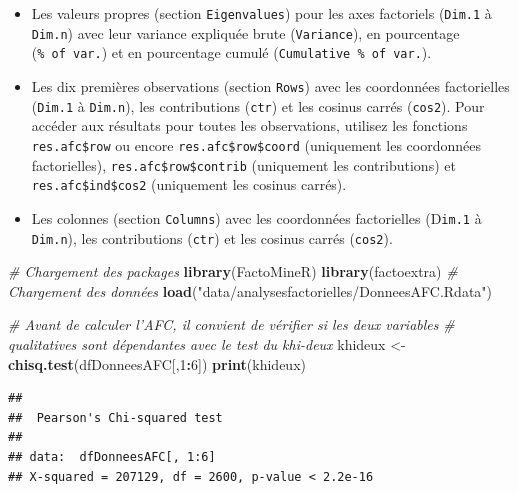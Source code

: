 \documentclass[
  11pt,
  french,
]{book}
\makeatletter
\newenvironment{Shaded}{\begin{snugshade}}{\end{snugshade}}
\newcommand{\CharTok}[1]{\textcolor[rgb]{0.31,0.60,0.02}{#1}}
\newcommand{\CommentTok}[1]{\textcolor[rgb]{0.56,0.35,0.01}{\textit{#1}}}
\newcommand{\ControlFlowTok}[1]{\textcolor[rgb]{0.13,0.29,0.53}{\textbf{#1}}}
\newcommand{\DecValTok}[1]{\textcolor[rgb]{0.00,0.00,0.81}{#1}}
\newcommand{\FloatTok}[1]{\textcolor[rgb]{0.00,0.00,0.81}{#1}}
\newcommand{\KeywordTok}[1]{\textcolor[rgb]{0.13,0.29,0.53}{\textbf{#1}}}
\newcommand{\NormalTok}[1]{#1}
\newcommand{\OperatorTok}[1]{\textcolor[rgb]{0.81,0.36,0.00}{\textbf{#1}}}
\newcommand{\StringTok}[1]{\textcolor[rgb]{0.31,0.60,0.02}{#1}}
\providecommand{\tightlist}{%
  \setlength{\itemsep}{0pt}\setlength{\parskip}{0pt}}
\newenvironment{kframe}{%
\medskip{}
\setlength{\fboxsep}{.8em}
 \def\at@end@of@kframe{}%
 \ifinner\ifhmode%
  \def\at@end@of@kframe{\end{minipage}}%
  \begin{minipage}{\columnwidth}%
 \fi\fi%
 \def\FrameCommand##1{\hskip\@totalleftmargin \hskip-\fboxsep
 \colorbox{shadecolor}{##1}\hskip-\fboxsep
     \hskip-\linewidth \hskip-\@totalleftmargin \hskip\columnwidth}%
 \MakeFramed {\advance\hsize-\width
   \@totalleftmargin\z@ \linewidth\hsize
   \@setminipage}}%
 {\par\unskip\endMakeFramed%
 \at@end@of@kframe}
\renewenvironment{Shaded}{\begin{kframe}}{\end{kframe}}
\makeatother
\begin{document}
\begin{itemize}
\tightlist
\item
  Les valeurs propres (section \texttt{Eigenvalues}) pour les axes factoriels (\texttt{Dim.1} à \texttt{Dim.n}) avec leur variance expliquée brute (\texttt{Variance}), en pourcentage (\texttt{\%\ of\ var.}) et en pourcentage cumulé (\texttt{Cumulative\ \%\ of\ var.}).
\item
  Les dix premières observations (section \texttt{Rows}) avec les coordonnées factorielles (\texttt{Dim.1} à \texttt{Dim.n}), les contributions (\texttt{ctr}) et les cosinus carrés (\texttt{cos2}). Pour accéder aux résultats pour toutes les observations, utilisez les fonctions \texttt{res.afc\$row} ou encore \texttt{res.afc\$row\$coord} (uniquement les coordonnées factorielles), \texttt{res.afc\$row\$contrib} (uniquement les contributions) et \texttt{res.afc\$ind\$cos2} (uniquement les cosinus carrés).
\item
  Les colonnes (section \texttt{Columns}) avec les coordonnées factorielles (D\texttt{im.1} à \texttt{Dim.n}), les contributions (\texttt{ctr}) et les cosinus carrés (\texttt{cos2}).
\end{itemize}

\begin{Shaded}
\begin{Highlighting}[]
\CommentTok{# Chargement des packages}
\KeywordTok{library}\NormalTok{(FactoMineR)}
\KeywordTok{library}\NormalTok{(factoextra)}
\CommentTok{# Chargement des données}
\KeywordTok{load}\NormalTok{(}\StringTok{"data/analysesfactorielles/DonneesAFC.Rdata"}\NormalTok{)}

\CommentTok{# Avant de calculer l'AFC, il convient de vérifier si les deux variables}
\CommentTok{# qualitatives sont dépendantes avec le test du khi-deux}
\NormalTok{khideux <-}\StringTok{ }\KeywordTok{chisq.test}\NormalTok{(dfDonneesAFC[,}\DecValTok{1}\OperatorTok{:}\DecValTok{6}\NormalTok{])}
\KeywordTok{print}\NormalTok{(khideux)}
\end{Highlighting}
\end{Shaded}

\begin{verbatim}
## 
##  Pearson's Chi-squared test
## 
## data:  dfDonneesAFC[, 1:6]
## X-squared = 207129, df = 2600, p-value < 2.2e-16
\end{verbatim}

\begin{Shaded}
\end{Shaded}
\end{document}
